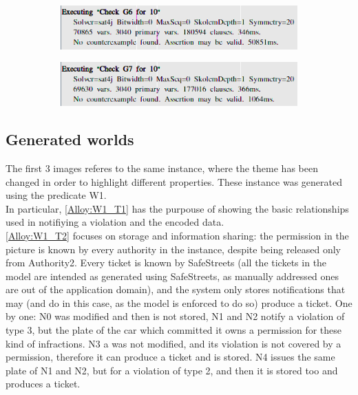 \documentclass{article}
\begin{document}
\begin{figure}[H]
\begin{subfigure}[H]{\linewidth}
		\end{subfigure}
		\begin{subfigure}[H]{\linewidth}
			\includegraphics[width=\linewidth]{Images/Alloy_G6.png}
		\end{subfigure}
		\begin{subfigure}[H]{\linewidth}
			\includegraphics[width=\linewidth]{Images/Alloy_G7.png}
		\end{subfigure}
	\end{figure}
	\subsection{Generated worlds} \label{section:Alloy worlds}
	The first 3 images referes to the same instance, where the theme 
	has been changed in order to highlight different properties. These instance was generated using
	the predicate W1.\\
	In particular, \ref{Alloy:W1_T1} has the purpouse of showing the basic relationships used in
	notifiying a violation and the encoded data.\\
	
	\ref{Alloy:W1_T2} focuses on storage and information sharing: the permission in the picture is
	known by every authority in the instance, despite being released only from Authority2. Every 
	ticket is known by SafeStreets (all the tickets in the model are intended as generated using
	SafeStreets, as manually addressed ones are out of the application domain), and the system only 	stores notifications that may (and do in this case, as the model is enforced to do so) produce
	a ticket. One by one: N0 was modified and then is not stored, N1 and N2 notify a violation of
	type 3, but the plate of the car which committed it owns a permission for these kind of
	infractions. N3 a was not modified, and its violation is not covered by a permission, therefore
	it can produce a ticket and is stored. N4 issues the same plate of N1 and N2, but for a
	violation of type 2, and then it is stored too and produces a ticket.\\
	
\end{document}

